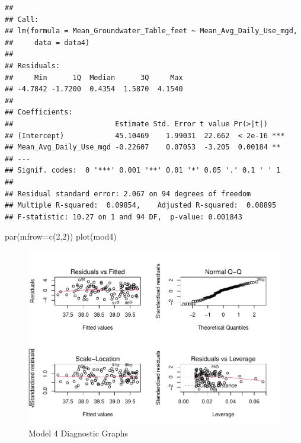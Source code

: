 \documentclass[
  12pt,
]{article}
\newenvironment{Shaded}{\begin{snugshade}}{\end{snugshade}}
\newcommand{\AttributeTok}[1]{\textcolor[rgb]{0.77,0.63,0.00}{#1}}
\newcommand{\DecValTok}[1]{\textcolor[rgb]{0.00,0.00,0.81}{#1}}
\newcommand{\FunctionTok}[1]{\textcolor[rgb]{0.00,0.00,0.00}{#1}}
\newcommand{\NormalTok}[1]{#1}
\begin{document}
\begin{verbatim}
## 
## Call:
## lm(formula = Mean_Groundwater_Table_feet ~ Mean_Avg_Daily_Use_mgd, 
##     data = data4)
## 
## Residuals:
##     Min      1Q  Median      3Q     Max 
## -4.7842 -1.7200  0.4354  1.5870  4.1540 
## 
## Coefficients:
##                        Estimate Std. Error t value Pr(>|t|)    
## (Intercept)            45.10469    1.99031  22.662  < 2e-16 ***
## Mean_Avg_Daily_Use_mgd -0.22607    0.07053  -3.205  0.00184 ** 
## ---
## Signif. codes:  0 '***' 0.001 '**' 0.01 '*' 0.05 '.' 0.1 ' ' 1
## 
## Residual standard error: 2.067 on 94 degrees of freedom
## Multiple R-squared:  0.09854,    Adjusted R-squared:  0.08895 
## F-statistic: 10.27 on 1 and 94 DF,  p-value: 0.001843
\end{verbatim}

\begin{Shaded}
\begin{Highlighting}[]
\FunctionTok{par}\NormalTok{(}\AttributeTok{mfrow=}\FunctionTok{c}\NormalTok{(}\DecValTok{2}\NormalTok{,}\DecValTok{2}\NormalTok{))}
\FunctionTok{plot}\NormalTok{(mod4)}
\end{Highlighting}
\end{Shaded}

\begin{figure}
\centering
\includegraphics{Project_files/figure-latex/groundwater and withdraws-1.pdf}
\caption{Model 4 Diagnostic Graphs}
\end{figure}
\end{document}
